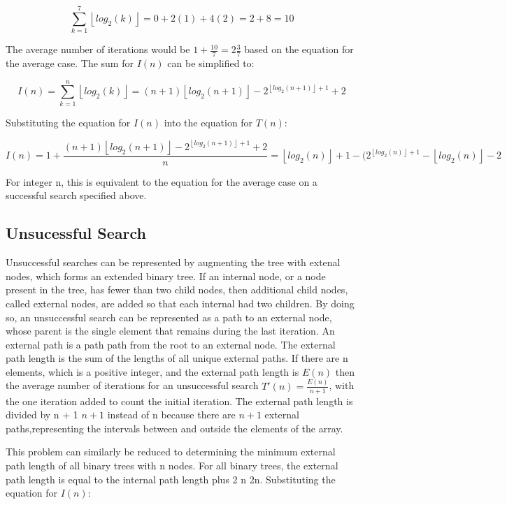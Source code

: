 \documentclass{article}
\begin{document}
$$\sum_{k=1}^{7} \left \lfloor {log_2 (k)}\right \rfloor = 0 + 2(1) + 4(2) = 2 + 8 = 10$$

The average number of iterations would be $1 + \frac{10}{7} = 2\frac{3}{7}$ based on the equation for the average case. The sum for $I(n)$ can be simplified to:

$$I(n) = \sum_{k=1}^n \left \lfloor {log_2 (k)}\right \rfloor = (n + 1) \left \lfloor {log_2 (n + 1)}\right \rfloor - 2^{\left \lfloor {log_2 (n + 1)}\right \rfloor + 1} + 2$$

Substituting the equation for $I(n)$ into the equation for $T(n)$:

$$I(n) = 1 + \frac{(n + 1)\left \lfloor {log_2 (n + 1)}\right \rfloor - 2^{\left \lfloor {log_2 (n + 1)}\right \rfloor + 1} + 2}{n} = \left \lfloor {log_2 (n)}\right \rfloor  + 1  - (2^{\left \lfloor {log_2 (n)}\right \rfloor  + 1} - \left \lfloor {log_2 (n)}\right \rfloor  - 2$$

For integer n, this is equivalent to the equation for the average case on a successful search specified above.
\subsection{Unsucessful Search}

Unsuccessful searches can be represented by augmenting the tree with extenal nodes, which forms an extended binary tree. If an internal node, or a node present in the tree, has fewer than two child nodes, then additional child nodes, called external nodes, are added so that each internal had two children. By doing so, an unsuccessful search can be represented as a path to an external node, whose parent is the single element that remains during the last iteration. An external path is a path path from the root to an external node. The external path length is the sum of the lengths of all unique external paths. If there are n elements, which is a positive integer, and the external path length  is $E(n)$ then the average number of iterations for an unsuccessful search  $T'(n) = \frac{E(n)}{n + 1}$, with the one iteration added to count the initial iteration. The external path length is divided by n + 1  $n + 1$ instead of n because there are $n + 1$ external paths,representing the intervals between and outside the elements of the array.


This problem can similarly be reduced to determining the minimum external path length of all binary trees with n nodes. For all binary trees, the external path length is equal to the internal path length plus 2 n 2n. Substituting the equation for $I(n)$:
\end{document}
